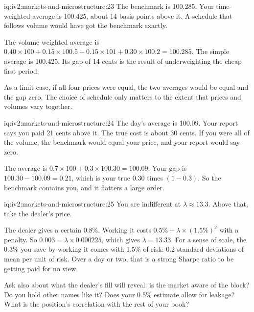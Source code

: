 \begin{solution}{iq:iv2:markets-and-microstructure:23}
The benchmark is 100.285. Your time-weighted average is 100.425, about 14 basis points above it. A schedule that follows volume would have got the benchmark exactly.

The volume-weighted average is $0.40 \times 100 + 0.15 \times 100.5 + 0.15 \times 101 + 0.30 \times 100.2 = 100.285$. The simple average is 100.425. Its gap of 14 cents is the result of underweighting the cheap first period.

As a limit case, if all four prices were equal, the two averages would be equal and the gap zero. The choice of schedule only matters to the extent that prices and volumes vary together.

\end{solution}

\begin{solution}{iq:iv2:markets-and-microstructure:24}
The day's average is 100.09. Your report says you paid 21 cents above it. The true cost is about 30 cents. If you were all of the volume, the benchmark would equal your price, and your report would say zero.

The average is $0.7 \times 100 + 0.3 \times 100.30 = 100.09$. Your gap is $100.30 - 100.09 = 0.21$, which is your true 0.30 times $(1 - 0.3)$. So the benchmark contains you, and it flatters a large order.

\end{solution}

\begin{solution}{iq:iv2:markets-and-microstructure:25}
You are indifferent at $\lambda \approx 13.3$. Above that, take the dealer's price.

The dealer gives a certain 0.8\%. Working it costs $0.5\% + \lambda \times (1.5\%)^2$ with a penalty. So $0.003 = \lambda \times 0.000225$, which gives $\lambda = 13.33$. For a sense of scale, the 0.3\% you save by working it comes with 1.5\% of risk: 0.2 standard deviations of mean per unit of risk. Over a day or two, that is a strong Sharpe ratio to be getting paid for no view.

Ask also about what the dealer's fill will reveal: is the market aware of the block? Do you hold other names like it? Does your 0.5\% estimate allow for leakage? What is the position's correlation with the rest of your book?

\end{solution}

